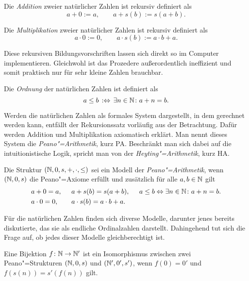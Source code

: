 \begin{Definition}\newlinefirst
Die \emph{Addition} zweier natürlicher Zahlen ist rekursiv definiert als
\[a+0 := a,\qquad a+s(b) := s(a+b).\]
\end{Definition}
\begin{Definition}\newlinefirst
Die \emph{Multiplikation} zweier natürlicher Zahlen ist rekursiv definiert als
\[a\cdot 0 := 0,\qquad a\cdot s(b) := a\cdot b + a.\]
\end{Definition}

\noindent
Diese rekursiven Bildungsvorschriften lassen sich direkt so im Computer
implementieren. Gleichwohl ist das Prozedere außerordentlich
ineffizient und somit praktisch nur für sehr kleine Zahlen brauchbar.

\begin{Definition}\newlinefirst
Die \emph{Ordnung} der natürlichen Zahlen ist definiert als
\[a\le b\,:\Leftrightarrow\,\exists n\in\mathbb N\colon a+n = b.\]
\end{Definition}

\noindent
Werden die natürlichen Zahlen als formales System dargestellt, in dem
gerechnet werden kann, entfällt der Rekursionssatz vorläufig aus der
Betrachtung. Dafür werden Addition und Multiplikation axiomatisch erklärt.
Man nennt dieses System die \emph{Peano"=Arithmetik}, kurz PA. Beschränkt
man sich dabei auf die intuitionistische Logik, spricht man von der
\emph{Heyting"=Arithmetik}, kurz HA.
\begin{Definition}\newlinefirst
Die Struktur $(\mathbb N,0,s,+,\cdot,\le)$ sei ein Modell der
\emph{Peano"=Arithmetik}, wenn $(\mathbb N,0,s)$ die Peano"=Axiome
erfüllt und zusätzlich für alle $a,b\in\mathbb N$ gilt
\[\begin{array}{@{}l@{\quad\;\;}l@{\quad\;\;}l@{}}
a+0 = a, & a+s(b) = s(a+b), &
a\le b \bicond \exists n\in\N\colon a+n = b.\\[3pt]
a\cdot 0 = 0, & a\cdot s(b) = a\cdot b + a.
\end{array}\]
\end{Definition}

\noindent
Für die natürlichen Zahlen finden sich diverse Modelle, darunter jenes
bereits diskutierte, das sie als endliche Ordinalzahlen darstellt.
Dahingehend tut sich die Frage auf, ob jedes dieser Modelle
gleichberechtigt ist.

\begin{Definition}%
\label{def:Isomorphismus-Peano}\newlinefirst
Eine Bijektion $f\colon\mathbb N\to\mathbb N'$ ist ein Isomorphismus zwischen
zwei Peano"=Strukturen $(\mathbb N,0,s)$ und $(\mathbb N',0',s')$, wenn
$f(0)=0'$ und $f(s(n))=s'(f(n))$ gilt.
\end{Definition}

